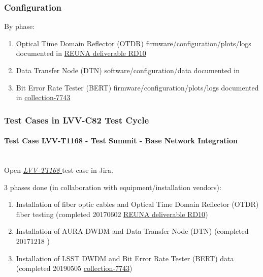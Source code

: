 \documentclass[DM,STR,toc]{lsstdoc}
\providecommand{\tightlist}{
  \setlength{\itemsep}{0pt}\setlength{\parskip}{0pt}}
\begin{document}
  \subsubsection{Configuration}
    By phase:\\

\begin{enumerate}
\tightlist
\item
  Optical Time Domain Reflector (OTDR) firmware/configuration/plots/logs
  documented in
  \href{https://docushare.lsstcorp.org/docushare/dsweb/Get/Document-26270/RD10\%20Report\%20of\%20delivery\%20of\%20LS\%20-\%20AG\%20fiber\%20from\%20Telefonica\%20to\%20REUNA.pdf}{REUNA
  deliverable RD10}
\item
  Data Transfer Node (DTN) software/configuration/data documented in
\item
  Bit Error Rate Tester (BERT) firmware/configuration/plots/logs
  documented in
  \href{https://docushare.lsstcorp.org/docushare/dsweb/View/Collection-7743}{collection-7743}
\end{enumerate}


  \subsubsection{Test Cases in LVV-C82 Test Cycle}


    \paragraph{Test Case LVV-T1168 - Test Summit - Base Network Integration
 }\mbox{}\\

Open  \href{https://jira.lsstcorp.org/secure/Tests.jspa#/testCase/LVV-T1168}{\textit{ LVV-T1168 } }
test case in Jira.

    3 phases done (in collaboration with equipment/installation vendors):

\begin{enumerate}
\tightlist
\item
  Installation of fiber optic cables and Optical Time Domain Reflector
  (OTDR) fiber testing (completed 20170602
  \href{https://docushare.lsstcorp.org/docushare/dsweb/Get/Document-26270/RD10\%20Report\%20of\%20delivery\%20of\%20LS\%20-\%20AG\%20fiber\%20from\%20Telefonica\%20to\%20REUNA.pdf}{REUNA
  deliverable RD10})
\item
  Installation of AURA DWDM and Data Transfer Node (DTN) (completed
  20171218 )
\item
  Installation of LSST DWDM and Bit Error Rate Tester (BERT) data
  (completed 20190505
  \href{https://docushare.lsstcorp.org/docushare/dsweb/View/Collection-7743}{collection-7743})
\end{enumerate}
\end{document}
